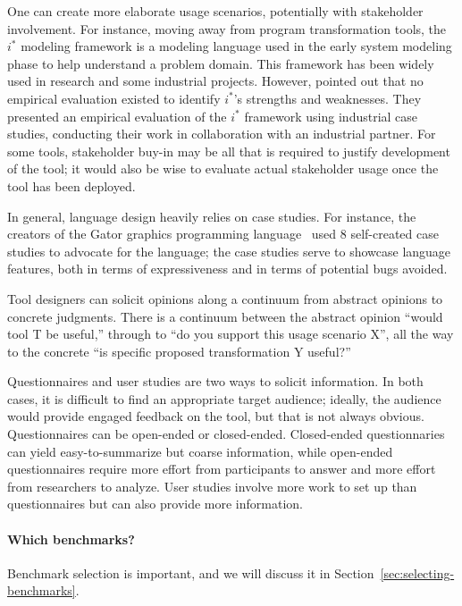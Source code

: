 One can create more elaborate usage scenarios, potentially
with stakeholder involvement.
For instance, moving away from program transformation tools, the $i^*$ modeling framework is a modeling language used in the early
system modeling phase to help understand a problem domain. This
framework has been widely used in research and some industrial
projects. However,  pointed out that no
empirical evaluation existed to identify $i^*$'s strengths and
weaknesses. They presented an empirical evaluation of the $i^*$
framework using industrial case studies, conducting their work in
collaboration with an industrial partner. 
For some tools, stakeholder buy-in may be all that is required
to justify development of the tool; it would also be wise to
evaluate actual stakeholder usage once the tool has been deployed.

In general, language design heavily relies on case studies.
For instance, the creators of the Gator graphics programming language~\cite{geisler20:_geomet_types_graph_progr} used 8 self-created case studies to advocate for the language; the case studies serve to showcase language features, both in terms of expressiveness and in terms of potential bugs avoided.

Tool designers can solicit opinions along a continuum from abstract
opinions to concrete judgments. There is a continuum between the
abstract opinion ``would tool T be useful,'' through to ``do you
support this usage scenario X'', all the way to the concrete ``is
specific proposed transformation Y useful?''

Questionnaires and user studies are two ways to solicit
information. In both cases, it is difficult to find an appropriate
target audience; ideally, the audience would provide engaged feedback
on the tool, but that is not always obvious.  Questionnaires can be
open-ended or closed-ended. Closed-ended questionnaries can yield
easy-to-summarize but coarse information, while open-ended
questionnaires require more effort from participants to answer and
more effort from researchers to analyze. User studies involve more
work to set up than questionnaires but can also provide more
information.

\paragraph{Which benchmarks?} Benchmark selection is important,
and we will discuss it in Section~\ref{sec:selecting-benchmarks}.

